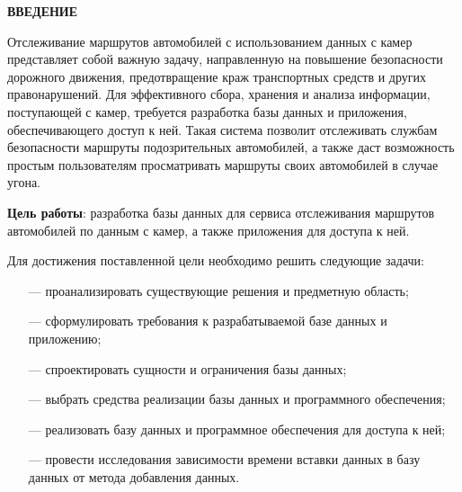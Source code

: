 \begin{center}
    \textbf{ВВЕДЕНИЕ}
\end{center}

Отслеживание маршрутов автомобилей с использованием данных с камер представляет собой важную задачу, направленную на повышение безопасности дорожного движения, предотвращение краж транспортных средств и других правонарушений. Для эффективного сбора, хранения и анализа информации, поступающей с камер, требуется разработка базы данных и приложения, обеспечивающего доступ к ней. Такая система позволит отслеживать службам безопасности маршруты подозрительных автомобилей, а также даст возможность простым пользователям просматривать маршруты своих автомобилей в случае угона. 

\textbf{Цель работы}: разработка базы данных для сервиса отслеживания маршрутов автомобилей по данным с камер, а также приложения для доступа к ней.

Для достижения поставленной цели необходимо решить следующие
задачи:

\begin{itemize}
    \item[---] проанализировать существующие решения и предметную область;
    \item[---] сформулировать требования к разрабатываемой базе данных и приложению;
    \item[---] спроектировать сущности и ограничения базы данных;
    \item[---] выбрать средства реализации базы данных и программного обеспечения;
    \item[---] реализовать базу данных и программное обеспечения для доступа к ней;
    \item[---] провести исследования зависимости времени вставки данных в базу данных от метода добавления данных.
\end{itemize}